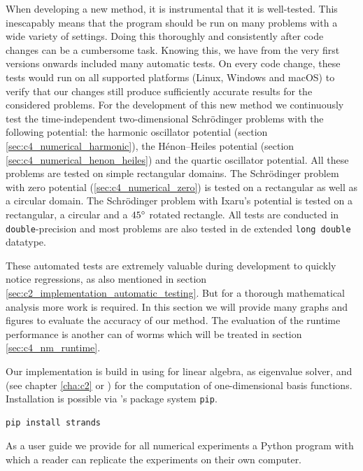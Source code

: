 When developing a new method, it is instrumental that it is well-tested. This inescapably means that the program should be run on many problems with a wide variety of settings. Doing this thoroughly and consistently after code changes can be a cumbersome task. Knowing this, we have from the very first versions onwards included many automatic tests. On every code change, these tests would run on all supported platforms (Linux, Windows and macOS) to verify that our changes still produce sufficiently accurate results for the considered problems. For the development of this new method we continuously test the time-independent two-dimensional Schrödinger problems with the following potential: the harmonic oscillator potential (section \ref{sec:c4_numerical_harmonic}), the Hénon--Heiles potential (section \ref{sec:c4_numerical_henon_heiles}) and the quartic oscillator potential. All these problems are tested on simple rectangular domains. The Schrödinger problem with zero potential (\ref{sec:c4_numerical_zero}) is tested on a rectangular as well as a circular domain. The Schrödinger problem with Ixaru's potential is tested on a rectangular, a circular and a $45\degree$ rotated rectangle. All tests are conducted in \texttt{double}-precision and most problems are also tested in de extended \texttt{long double} datatype.

These automated tests are extremely valuable during development to quickly notice regressions, as also mentioned in section \ref{sec:c2_implementation_automatic_testing}. But for a thorough mathematical analysis more work is required. In this section we will provide many graphs and figures to evaluate the accuracy of our method. The evaluation of the runtime performance is another can of worms which will be treated in section \ref{sec:c4_nm_runtime}.

Our implementation is build in \cpp{} using \Eigen{} \cite{guennebaud_eigen_2010} for linear algebra, \spectra{} \cite{qiu_yixuan_2022} as eigenvalue solver, and  (see chapter \ref{cha:c2} or \cite{baeyens_fast_2020}) for the computation of one-dimensional basis functions. Installation is possible via \lpython{}'s package system \texttt{pip}.
\begin{verbatim}
pip install strands
\end{verbatim}

As a user guide we provide for all numerical experiments a Python program with which a reader can replicate the experiments on their own computer.


